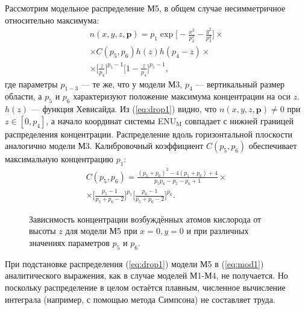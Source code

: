 \documentclass[12pt,a4paper]{article}
\renewcommand{\vec}{\mathbf}
\begin{document}
Рассмотрим модельное распределение М5, в общем случае несимметричное относительно максимума:
\begin{equation}\label{eq:drop1}
\begin{split}
n(x,y,z,\vec{p})=p_1 \exp{\bigg[-\frac{x^2}{p_2^2}-\frac{y^2}{p_3^2}\bigg]} \times \\
\times C(p_5,p_6) h(z) h(p_4-z) \times \\
\times \bigg[\frac{z}{p_4}\bigg]^{p_5-1}
\bigg[1-\frac{z}{p_4}\bigg]^{p_5-1},
\end{split}
\end{equation}
где параметры $p_{1-3}$ --- те же, что у модели М3, $p_4$ --- вертикальный размер области, а $p_5$ и $p_6$ характеризуют положение максимума концентрации на оси $z$. $h(z)$ --- функция Хевисайда. Из (\ref{eq:drop1}) видно, что $n(x,y,z,\vec{p})\neq 0$ при $z\in [0,p_4]$, а начало координат системы ENU$_\text{M}$ совпадает с нижней границей распределения концентрации. Распределение вдоль горизонтальной плоскости аналогично модели М3. Калибровочный коэффициент $C(p_5,p_6)$ обеспечивает максимальную концентрацию $p_1$:
\begin{equation}\label{eq:drop2}
\begin{split}
C(p_5,p_6)=\frac{(p_5+p_6)^2 -4(p_5+p_6)+4 }{p_5p_6-p_5-p_6+1} \times \\
\times \bigg[ \frac{p_5-1}{p_5+p_6-2}  \bigg] ^{p_5}
\bigg[ \frac{p_6-1}{p_5+p_6-2}  \bigg] ^{p_6}.
\end{split}
\end{equation}

\begin{figure}[h]
	\caption{Зависимость концентрации возбуждённых атомов кислорода от высоты $z$ для модели М5 при $x=0, y=0$ и при различных значениях параметров $p_5$ и $p_6$.}
	\label{fig:fig6}
\end{figure}

При подстановке распределения (\ref{eq:drop1}) модели М5 в (\ref{eq:mod1}) аналитического выражения, как в случае моделей М1-М4, не получается. Но поскольку распределение в целом остаётся плавным, численное вычисление интеграла (например, с помощью метода Симпсона) не составляет труда.  
\end{document}
